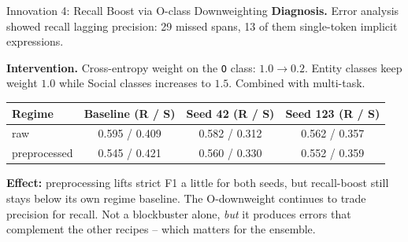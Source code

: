 \documentclass[aspectratio=169,10pt]{beamer}
\begin{document}
\begin{frame}{Innovation 4: Recall Boost via O-class Downweighting}
  \textbf{Diagnosis.} Error analysis showed recall lagging precision:
  29 missed spans, 13 of them single-token implicit expressions.
  \medskip

  \textbf{Intervention.} Cross-entropy weight on the \texttt{O} class: $1.0 \to 0.2$.
  Entity classes keep weight $1.0$ while Social classes increases to $1.5$. Combined with multi-task.
  \medskip

  \begin{center}\small
  \begin{tabular}{lccc}
    \toprule
    Regime & Baseline (R / S) & Seed 42 (R / S) & Seed 123 (R / S) \\
    \midrule
    raw & 0.595 / 0.409 & 0.582 / 0.312 & 0.562 / 0.357 \\
    preprocessed & 0.545 / 0.421 & 0.560 / 0.330 & 0.552 / 0.359 \\
    \bottomrule
  \end{tabular}
  \end{center}
  \medskip

  \textbf{Effect:} preprocessing lifts strict F1 a little for both seeds, but recall-boost still stays below its own regime baseline. The O-downweight continues to trade precision for recall.
  Not a blockbuster alone, \emph{but} it produces errors that complement the other recipes --
  which matters for the ensemble.
\end{frame}
\end{document}

